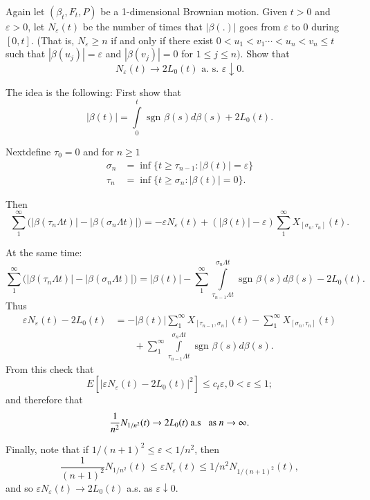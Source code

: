 \begin{exercise} %
Again let $(\beta_t,F_t ,P)$ be a 1-dimensional Brownian
motion. Given $t > 0$ and $\varepsilon > 0$, let $N_{\varepsilon}(t)$
be the number of times that $| \beta(.)|$ goes from $\varepsilon$ to
0 during $[0,t]$. (That is, $N_{\varepsilon} \geq n$ if and only if
there exist $0 < u_1 < v_1 \cdots < u_n < v_n \leq t$ such that
$|\beta(u_j)| = \varepsilon$ and $|\beta(v_j)| = 0$ for $1 \leq j \leq
n)$. Show that  
$$
N_{\varepsilon}(t) \to 2L_0(t) \text{ a. s. } \varepsilon \downarrow
0. 
$$

The idea is the following: First show that 
$$
|\beta(t)| = \int \limits^t_0 \text{ sgn }  \beta (s) d \beta(s) +
2L_0 (t). 
$$

Next\pageoriginale define $\tau_0 =0$ and for $n \geq 1$ 
\begin{align*}
\sigma_n & = \inf \{ t \geq \tau_{n-1}: |\beta(t)| =\varepsilon \}\\ 
\tau_n & = \inf \{ t \geq \sigma_{n}: |\beta(t)| =0 \}.
\end{align*}

Then 
$$
\sum^{\infty}_{1} \bigg( | \beta(\tau_n \Lambda t)|-  | \beta(\sigma_n
\Lambda t)| \bigg) = - \varepsilon N_{\varepsilon}(t) + (|\beta(t)| -
\varepsilon) \sum^{\infty}_1 X_{[ \sigma_n , \tau_n ]}(t). 
$$
 
At the same time:
$$
\sum^{\infty}_{1} \bigg( | \beta(\tau_n \Lambda t)|-  | \beta(\sigma_n
\Lambda t)| \bigg)= | \beta(t)|-\sum^{\infty}_{1}  \int
\limits^{\sigma_n \Lambda t}_{\tau_{n-1} \Lambda t} \text{ sgn }
\beta(s) d \beta(s) - 2L_0 (t). 
$$
Thus 
\begin{align*}
\varepsilon N_{\varepsilon}(t) - 2L_0(t) & = - |\beta(t)|
\sum^{\infty}_{1}  X_{[\tau_{n-1}, \sigma_n]}(t) - \sum^{\infty}_{1}
X_{[ \sigma_n, \tau_n]}(t)\\
& \qquad  + \sum^{\infty}_{1}  \int \limits^{\sigma_n
  \Lambda t}_{\tau_{n-1} \Lambda t} \text{ sgn } \beta(s) d \beta(s). 
\end{align*}
From this check that 
$$
E[ | \varepsilon N_{\varepsilon}(t) - 2L_0 (t) |^2] \leq c_t
\varepsilon, 0 < \varepsilon \leq 1; 
$$
and therefore that 
$$
\frac{1}{n^2} N_{1/n^2}(t) \to 2 L_0 (t) \text{ a.s  \; as } n \to \infty. 
$$

Finally, note that if $1/(n+1)^2 \leq \varepsilon < 1/n^2$, then  
$$
\frac{1}{(n+1)^2} N_{1/n^2} (t) \leq \varepsilon N_{\varepsilon}(t) 
\leq 1/n^2 N_{1/(n+1)^2} (t), 
$$
and so $\varepsilon N_{\varepsilon}(t) \to 2L_0(t)$ a.s. as
$\varepsilon \downarrow 0$.  
\end{exercise}


